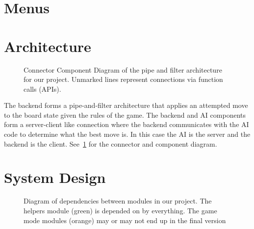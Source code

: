\documentclass[11pt, oneside]{article}
\begin{document}
\begin{enumerate}
\section{Menus}

\section{Architecture}
\begin{figure}[H]\label{fig:CCD}
  \centering
  \caption{Connector Component Diagram of the pipe and filter architecture for
    our project. Unmarked lines represent connections via function calls
    (APIs).}
\end{figure}
The backend forms a pipe-and-filter architecture that applies an attempted move
to the board state given the rules of the game. The backend and AI components
form a server-client like connection where the backend communicates with the AI
code to determine what the best move is. In this case the AI is the server and
the backend is the client. See~\ref{fig:CCD} for the connector and component
diagram.

\section{System Design}
\begin{figure}[H]\label{fig:MDD}
  \centering
  \caption{Diagram of dependencies between modules in our project. The helpers
    module (green) is depended on by everything. The game mode modules (orange)
    may or may not end up in the final version}
\end{figure}


\end{enumerate}
\end{document}
